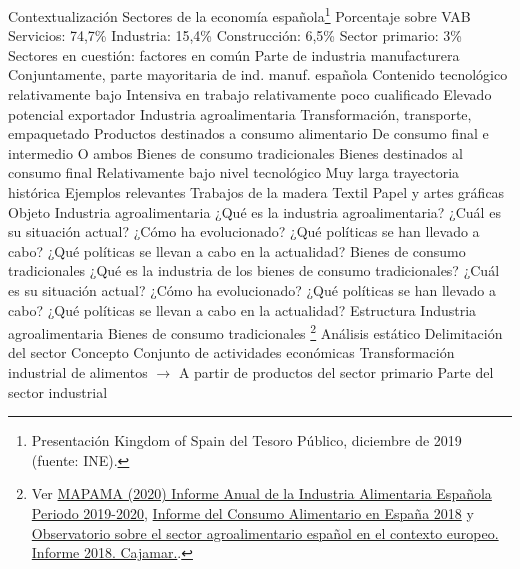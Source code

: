 \documentclass{nuevotema}
\begin{document}
\esquemalargo

\begin{esquemal}
	\1[] 
		\2 Contextualización
			\3 Sectores de la economía española\footnote{Presentación Kingdom of Spain del Tesoro Público, diciembre de 2019 (fuente: INE).}
				\4 Porcentaje sobre VAB
				\4 Servicios: 74,7\%
				\4 Industria: 15,4\%
				\4 Construcción: 6,5\%
				\4 Sector primario: 3\%
			\3 Sectores en cuestión: factores en común
				\4 Parte de industria manufacturera
				\4[] Conjuntamente, parte mayoritaria de ind. manuf. española
				\4 Contenido tecnológico relativamente bajo
				\4 Intensiva en trabajo relativamente poco cualificado
				\4 Elevado potencial exportador
			\3 Industria agroalimentaria
				\4 Transformación, transporte, empaquetado
				\4 Productos destinados a consumo alimentario
				\4 De consumo final e intermedio
				\4[] O ambos
			\3 Bienes de consumo tradicionales
				\4 Bienes destinados al consumo final
				\4 Relativamente bajo nivel tecnológico
				\4 Muy larga trayectoria histórica
				\4 Ejemplos relevantes
				\4[] Trabajos de la madera
				\4[] Textil
				\4[] Papel y artes gráficas
		\2 Objeto
			\3 Industria agroalimentaria
				\4 ¿Qué es la industria agroalimentaria?
				\4 ¿Cuál es su situación actual?
				\4 ¿Cómo ha evolucionado?
				\4 ¿Qué políticas se han llevado a cabo?
				\4 ¿Qué políticas se llevan a cabo en la actualidad?
			\3 Bienes de consumo tradicionales
				\4 ¿Qué es la industria de los bienes de consumo tradicionales?
				\4 ¿Cuál es su situación actual?
				\4 ¿Cómo ha evolucionado?
				\4 ¿Qué políticas se han llevado a cabo?
				\4 ¿Qué políticas se llevan a cabo en la actualidad?
		\2 Estructura
			\3 Industria agroalimentaria
			\3 Bienes de consumo tradicionales
	\1 \footnote{Ver \href{https://www.mapa.gob.es/es/alimentacion/temas/industria-agroalimentaria/_informeanualindustria2019-2020_tcm30-542507.pdf}{MAPAMA (2020) Informe Anual de la Industria Alimentaria Española Periodo 2019-2020}, \href{https://www.mapa.gob.es/images/es/20190807_informedeconsumo2018pdf_tcm30-512256.pdf}{Informe del Consumo Alimentario en España 2018} y \href{https://www.cajamar.es/es/pdf/observatorio-sector-agro.pdf}{Observatorio sobre el sector agroalimentario español en el contexto europeo. Informe 2018. Cajamar.}.}
		\2 Análisis estático
			\3 Delimitación del sector
				\4 Concepto
				\4[] Conjunto de actividades económicas
				\4[] Transformación industrial de alimentos
				\4[] $\to$ A partir de productos del sector primario
				\4[] Parte del sector industrial

\end{esquemal}
\end{document}
